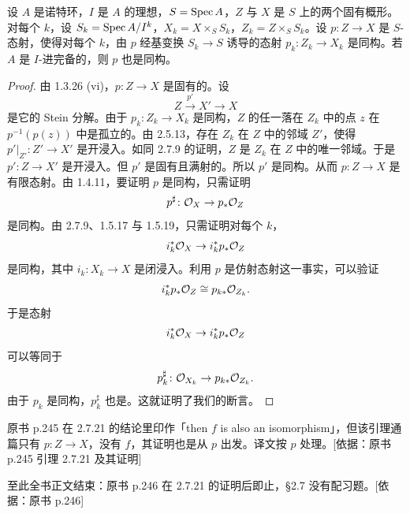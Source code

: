 \begin{lemma}\label{it:2.7.21}
设 $A$ 是诺特环，$I$ 是 $A$ 的理想，$S=\operatorname{Spec} A$，$Z$ 与 $X$ 是 $S$ 上的两个固有概形。对每个 $k$，设 $S_k=\operatorname{Spec} A/I^k$，$X_k=X\times_S S_k$，$Z_k=Z\times_S S_k$。设 $p\colon Z\to X$ 是 $S$-态射，使得对每个 $k$，由 $p$ 经基变换 $S_k\to S$ 诱导的态射 $p_k\colon Z_k\to X_k$ 是同构。若 $A$ 是 $I$-进完备的，则 $p$ 也是同构。
\end{lemma}

\begin{proof}
由 1.3.26 (vi)，$p\colon Z\to X$ 是固有的。设
\begin{equation*}
Z\xrightarrow{p'}X'\to X
\end{equation*}
是它的 Stein 分解。由于 $p_k\colon Z_k\to X_k$ 是同构，$Z$ 的任一落在 $Z_k$ 中的点 $z$ 在 $p^{-1}(p(z))$ 中是孤立的。由 2.5.13，存在 $Z_k$ 在 $Z$ 中的邻域 $Z'$，使得 $p'|_{Z'}\colon Z'\to X'$ 是开浸入。如同 2.7.9 的证明，$Z$ 是 $Z_k$ 在 $Z$ 中的唯一邻域。于是 $p'\colon Z\to X'$ 是开浸入。但 $p'$ 是固有且满射的。所以 $p'$ 是同构。从而 $p\colon Z\to X$ 是有限态射。由 1.4.11，要证明 $p$ 是同构，只需证明
\begin{equation*}
p^{\sharp}\colon\mathcal{O}_X\to p_*\mathcal{O}_Z
\end{equation*}
是同构。由 2.7.9、1.5.17 与 1.5.19，只需证明对每个 $k$，
\begin{equation*}
i_k^*\mathcal{O}_X\to i_k^*p_*\mathcal{O}_Z
\end{equation*}
是同构，其中 $i_k\colon X_k\to X$ 是闭浸入。利用 $p$ 是仿射态射这一事实，可以验证
\begin{equation*}
i_k^*p_*\mathcal{O}_Z\cong p_{k*}\mathcal{O}_{Z_k}.
\end{equation*}
于是态射
\begin{equation*}
i_k^*\mathcal{O}_X\to i_k^*p_*\mathcal{O}_Z
\end{equation*}
可以等同于
\begin{equation*}
p_k^{\sharp}\colon\mathcal{O}_{X_k}\to p_{k*}\mathcal{O}_{Z_k}.
\end{equation*}
由于 $p_k$ 是同构，$p_k^{\sharp}$ 也是。这就证明了我们的断言。
\end{proof}

\begin{tnote}
原书 p.245 在 2.7.21 的结论里印作「then $f$ is also an isomorphism」，但该引理通篇只有 $p\colon Z\to X$，没有 $f$，其证明也是从 $p$ 出发。译文按 $p$ 处理。[依据：原书 p.245 引理 2.7.21 及其证明]
\end{tnote}

\begin{tnote}
至此全书正文结束：原书 p.246 在 2.7.21 的证明后即止，§2.7 没有配习题。[依据：原书 p.246]
\end{tnote}

